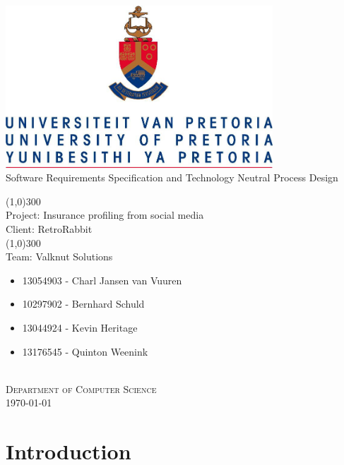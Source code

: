 \documentclass{article}
\begin{document}
	\begin{titlepage}
		\begin{center}
			\includegraphics[width=10cm]{images/UP.jpg}  \\
			[0.5cm]
			\huge{
			Software Requirements Specification and
			Technology Neutral Process Design\\
			}

			\line(1,0){300}\\
			[0.2cm]
			\LARGE{Project: Insurance profiling from social media\\
			Client: RetroRabbit} \\
			\line(1,0){300}\\
			\LARGE{Team: Valknut Solutions}\\
			[1.0cm]
			\large
			{
			\begin{itemize}
				\item 13054903 - Charl Jansen van Vuuren
				\item 10297902 - Bernhard Schuld
				\item 13044924 - Kevin Heritage
				\item 13176545 - Quinton Weenink\\
			\end{itemize}
			}
			\textsc{\large}\\
		[3.0cm]
		\textsc{\large  Department of Computer Science}\\
		[0.5cm]
		\textsc{\large \today}\\
		\end{center}


	\end{titlepage}
	\cleardoublepage
	\tableofcontents
	\cleardoublepage
\section{Introduction}
\end{document}
